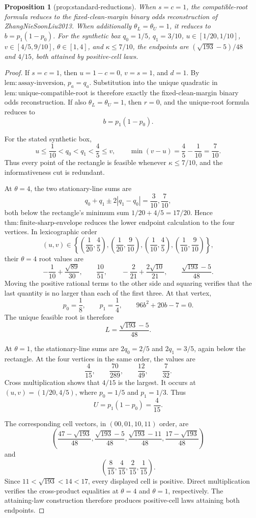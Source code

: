 \documentclass{article}
\newtheorem{proposition}{Proposition}
\begin{document}
\begin{proposition}[prop:standard-reductions]\label{prop:standard-reductions}
When \(s=c=1\), the compatible-root formula reduces to the fixed-clean-margin binary odds reconstruction of ZhangNieSoonLiu2013. When additionally \(\theta_L=\theta_U=1\), it reduces to \(b=p_1(1-p_0)\). For the synthetic box \(q_0=1/5\), \(q_1=3/10\), \(u\in[1/20,1/10]\), \(v\in[4/5,9/10]\), \(\theta\in[1,4]\), and \(\kappa\le7/10\), the endpoints are \((\sqrt{193}-5)/48\) and \(4/15\), both attained by positive-cell laws.
\end{proposition}
\begin{proof}
If \(s=c=1\), then \(u=1-c=0\), \(v=s=1\), and \(d=1\). By \(\mathrm{lem:assay\text{-}inversion}\), \(p_a=q_a\). Substitution into the unique quadratic in \(\mathrm{lem:unique\text{-}compatible\text{-}root}\) is therefore exactly the fixed-clean-margin binary odds reconstruction. If also \(\theta_L=\theta_U=1\), then \(r=0\), and the unique-root formula reduces to
\[
b=p_1(1-p_0).
\]

For the stated synthetic box,
\[
u\leq\frac1{10}<q_0<q_1<\frac45\leq v,
\qquad
\min(v-u)=\frac45-\frac1{10}=\frac7{10}.
\]
Thus every point of the rectangle is feasible whenever \(\kappa\leq7/10\), and the informativeness cut is redundant.

At \(\theta=4\), the two stationary-line sums are
\[
q_0+q_1\pm2|q_1-q_0|
=\frac3{10},\frac7{10},
\]
both below the rectangle's minimum sum \(1/20+4/5=17/20\). Hence \(\mathrm{thm:finite\text{-}sharp\text{-}envelope}\) reduces the lower endpoint calculation to the four vertices. In lexicographic order
\[
(u,v)\in
\left\{
\left(\frac1{20},\frac45\right),
\left(\frac1{20},\frac9{10}\right),
\left(\frac1{10},\frac45\right),
\left(\frac1{10},\frac9{10}\right)
\right\},
\]
their \(\theta=4\) root values are
\[
-\frac1{10}+\frac{\sqrt{89}}{30},
\qquad
\frac{10}{51},
\qquad
-\frac2{21}+\frac{2\sqrt{10}}{21},
\qquad
\frac{\sqrt{193}-5}{48}.
\]
Moving the positive rational terms to the other side and squaring verifies that the last quantity is no larger than each of the first three. At that vertex,
\[
p_0=\frac18,
\qquad
p_1=\frac14,
\qquad
96b^2+20b-7=0.
\]
The unique feasible root is therefore
\[
L=\frac{\sqrt{193}-5}{48}.
\]

At \(\theta=1\), the stationary-line sums are \(2q_0=2/5\) and \(2q_1=3/5\), again below the rectangle. At the four vertices in the same order, the values are
\[
\frac4{15},
\qquad
\frac{70}{289},
\qquad
\frac{12}{49},
\qquad
\frac7{32}.
\]
Cross multiplication shows that \(4/15\) is the largest. It occurs at \((u,v)=(1/20,4/5)\), where \(p_0=1/5\) and \(p_1=1/3\). Thus
\[
U=p_1(1-p_0)=\frac4{15}.
\]

The corresponding cell vectors, in \((00,01,10,11)\) order, are
\[
\left(
\frac{47-\sqrt{193}}{48},
\frac{\sqrt{193}-5}{48},
\frac{\sqrt{193}-11}{48},
\frac{17-\sqrt{193}}{48}
\right)
\]
and
\[
\left(\frac8{15},\frac4{15},\frac2{15},\frac1{15}\right).
\]
Since \(11<\sqrt{193}<14<17\), every displayed cell is positive. Direct multiplication verifies the cross-product equalities at \(\theta=4\) and \(\theta=1\), respectively. The attaining-law construction therefore produces positive-cell laws attaining both endpoints.
\end{proof}
\end{document}
